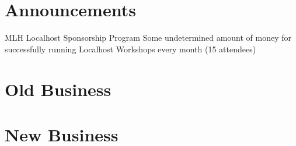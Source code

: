 \documentclass[11pt,hacksoc]{meetingmins}
\begin{document}
\maketitle

\section{Announcements}
\begin{items}
	\item
	MLH Localhost Sponsorship Program
		\subitem
		Some undetermined amount of money for successfully running Localhost Workshops every month (15 attendees)
		
	\item
	
	
\end{items}

\section{Old Business}
\begin{items}
\item
\end{items}

\section{New Business}
\begin{items}
\item
\end{items}

\vspace{1em}
\nextmeeting{}
\end{document}

